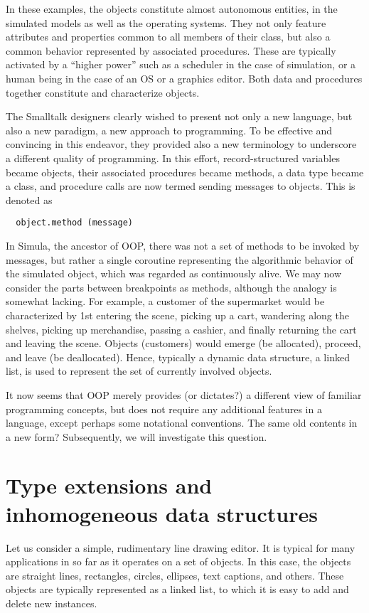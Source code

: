 In these examples, the objects constitute almost autonomous entities, in the simulated models as
well as the operating systems. They not only feature attributes and properties common to all
members of their class, but also a common behavior represented by associated procedures. These
are typically activated by a “higher power” such as a scheduler in the case of simulation, or a
human being in the case of an OS or a graphics editor. Both data and procedures together
constitute and characterize objects.

The Smalltalk designers clearly wished to present not only a new language, but also a new paradigm,
a new approach to programming. To be effective and convincing in this endeavor, they provided also
a new terminology to underscore a different quality of programming. In this effort,
record-structured variables became objects, their associated procedures became methods, a data type
became a class, and procedure calls are now termed sending messages to objects. This is denoted as
\begin{verbatim}
  object.method (message)
\end{verbatim}
In Simula, the ancestor of OOP, there was not a set of methods to be invoked by messages, but
rather a single coroutine representing the algorithmic behavior of the simulated object, which was
regarded as continuously alive. We may now consider the parts between breakpoints as methods,
although the analogy is somewhat lacking. For example, a customer of the supermarket would be
characterized by 1st entering the scene, picking up a cart, wandering along the shelves, picking
up merchandise, passing a cashier, and finally returning the cart and leaving the scene. Objects
(customers) would emerge (be allocated), proceed, and leave (be deallocated). Hence, typically a
dynamic data structure, a linked list, is used to represent the set of currently involved objects.

It now seems that OOP merely provides (or dictates?) a different view of familiar programming
concepts, but does not require any additional features in a language, except perhaps some notational
conventions. The same old contents in a new form? Subsequently, we will investigate this question.

\section{Type extensions and inhomogeneous data structures}
Let us consider a simple, rudimentary line drawing editor. It is typical for many applications in so
far as it operates on a set of objects. In this case, the objects are straight lines, rectangles,
circles, ellipses, text captions, and others. These objects are typically represented as a linked
list, to which it is easy to add and delete new instances.

